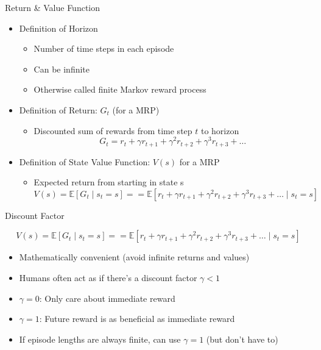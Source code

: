 \documentclass[aspectratio=169]{../latex_main/tntbeamer}  %
\begin{document}
\begin{frame}[c]{Return \& Value Function}
	
	\begin{itemize}
		\item Definition of Horizon
		\begin{itemize}
			\item Number of time steps in each episode
			\item Can be infinite
			\item Otherwise called finite Markov reward process
		\end{itemize}
	\smallskip
	\pause
		\item Definition of Return: $G_t$ (for a MRP)
		\begin{itemize}
			\item Discounted sum of rewards from time step $t$ to horizon
			$$ G_t = r_t + \gamma r_{t+1} + \gamma^2 r_{t+2} + \gamma^3 r_{t+3} + \ldots$$
		\end{itemize}
	\smallskip
	\pause
	\item Definition of State Value Function: $V(s)$ for a MRP
	\begin{itemize}
		\item Expected return from starting in state s
		$$ V(s)  = \mathbb{E}[G_t \mid s_t=s] == \mathbb{E}[r_t + \gamma r_{t+1} + \gamma^2 r_{t+2} + \gamma^3 r_{t+3} + \ldots \mid s_t = s]$$
	\end{itemize}
	\end{itemize}
	
\end{frame}
\begin{frame}[c]{Discount Factor}
	
$$ V(s)  = \mathbb{E}[G_t \mid s_t=s] == \mathbb{E}[r_t + \gamma r_{t+1} + \gamma^2 r_{t+2} + \gamma^3 r_{t+3} + \ldots \mid s_t = s]$$
	
	\begin{itemize}
		\item Mathematically convenient (avoid infinite returns and values)
		\item Humans often act as if there’s a discount factor $\gamma < 1$
		\item $\gamma = 0$: Only care about immediate reward
		\item $\gamma = 1$: Future reward is as beneficial as immediate reward
		\item If episode lengths are always finite, can use $\gamma = 1$ (but don't have to)
	\end{itemize}
	
\end{frame}
\end{document}
